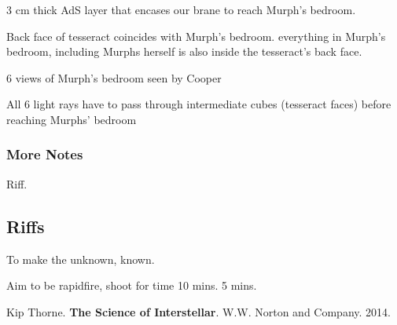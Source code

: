 \documentclass[10pt]{amsart}
\begin{document}
3 cm thick AdS layer that encases our brane to reach Murph's bedroom.

Back face of tesseract coincides with Murph's bedroom.
everything in Murph's bedroom, including Murphs herself is also inside the tesseract's back face.

6 views of Murph's bedroom seen by Cooper

All 6 light rays have to pass through intermediate cubes (tesseract faces) before reaching Murphs' bedroom




\subsubsection{More Notes}

Riff.


\subsection{Riffs}

To make the unknown, known.

Aim to be rapidfire, shoot for time 10 mins. 5 mins.

\begin{thebibliography}{9}

Kip Thorne. \textbf{The Science of Interstellar}. W.W. Norton and Company. 2014.

\end{thebibliography}
\end{document}
